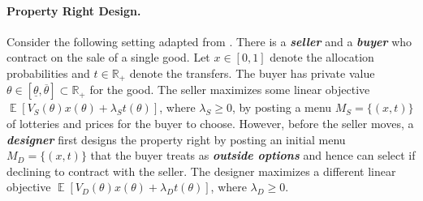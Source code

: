 \documentclass[12pt,letterpaper]{article}
\newenvironment{original}{\color{black}}{}
\theoremstyle{plain}
\theoremstyle{definition}
\theoremstyle{remark}
\DeclareMathOperator{\E}{\mathds{E}}
\newcommand{\R}{\mathds{R}}
\theoremstyle{definition}
\begin{document}
\paragraph{Property Right Design.}\hspace{-2mm}
\begin{original}
Consider the following setting adapted from \citet{DworczakMuir2024}. There is a \textit{\textbf{seller}} and a \textit{\textbf{buyer}} who contract on the sale of a single good. Let $x \in [0, 1]$ denote the allocation probabilities and $t \in \R_+$ denote the transfers. The buyer has private value $\theta \in [\underline{\theta}, \overline{\theta}] \subset \R_+$ for the good. The seller maximizes some linear objective $\E[V_S(\theta) x(\theta) + \lambda_S t(\theta)]$, where $\lambda_S \geq 0$, by posting a menu $M_S = \{(x, t)\}$ of lotteries and prices for the buyer to choose. However, before the seller moves, a \textit{\textbf{designer}} first designs the property right by posting an initial menu $M_D = \{(x, t)\}$ that the buyer treats as \textit{\textbf{outside options}} and hence can select if declining to contract with the seller. The designer maximizes a different linear objective $\E[V_D(\theta) x(\theta) + \lambda_D t(\theta)]$, where $\lambda_D \geq 0$.


\end{original}
\end{document}
